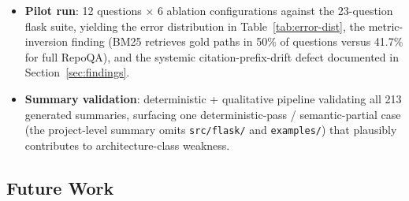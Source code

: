 \documentclass[11pt]{article}
\begin{document}
\begin{itemize}
    \item \textbf{Pilot run}: 12 questions $\times$ 6 ablation configurations against the 23-question flask suite, yielding the error distribution in Table~\ref{tab:error-dist}, the metric-inversion finding (BM25 retrieves gold paths in 50\% of questions versus 41.7\% for full RepoQA), and the systemic citation-prefix-drift defect documented in Section~\ref{sec:findings}.
    \item \textbf{Summary validation}: deterministic + qualitative pipeline validating all 213 generated summaries, surfacing one deterministic-pass / semantic-partial case (the project-level summary omits \texttt{src/flask/} and \texttt{examples/}) that plausibly contributes to architecture-class weakness.
\end{itemize}

\subsection{Future Work}
\end{document}
